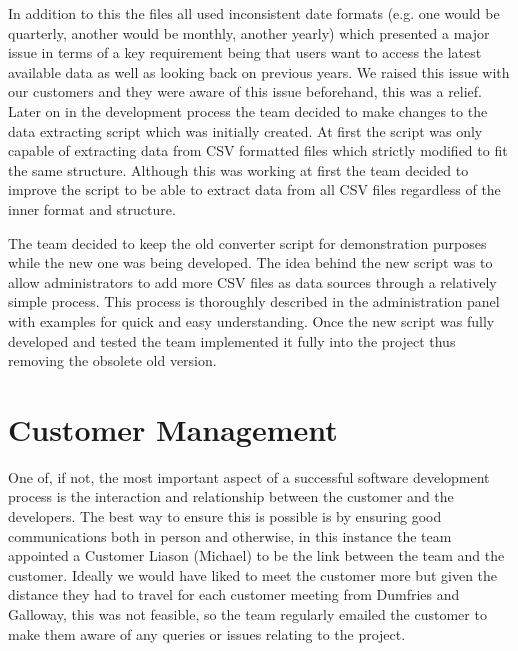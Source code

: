 \documentclass{l3proj}
\begin{document}
In addition to this the files all used inconsistent date formats (e.g. one would be quarterly, another would be monthly,
another yearly) which presented a major issue in terms of a key requirement being that users want to access the latest
available data as well as looking back on previous years. We raised this issue with our customers and they were aware of
this issue beforehand, this was a relief. Later on in the development process the team decided to make changes to the
data extracting script which was initially created. At first the script was only capable of extracting data from CSV
formatted files which strictly modified to fit the same structure. Although this was working at first the team decided
to improve the script to be able to extract data from all CSV files regardless of the inner format and structure.

The team decided to keep the old converter script for demonstration purposes while the new one was being developed.
The idea behind the new script was to allow administrators to add more CSV files as data sources through a relatively
simple process. This process is thoroughly described in the administration panel with examples for quick and easy
understanding. Once the new script was fully developed and tested the team implemented it fully into the project thus
removing the obsolete old version.



\section{Customer Management}
\label{sec:customer-management}


One of, if not, the most important aspect of a successful software development process is the interaction and relationship
between the customer and the developers. The best way to ensure this is possible is by ensuring good communications
both in person and otherwise, in this instance the team appointed a Customer Liason (Michael) to be the link between the
team and the customer. Ideally we would have liked to meet the customer more but given the distance they had to travel
for each customer meeting from Dumfries and Galloway, this was not feasible, so the team regularly emailed the customer
to make them aware of any queries or issues relating to the project.
\end{document}
